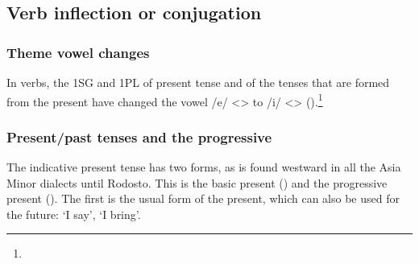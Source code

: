 \subsection{Verb inflection or conjugation}
\subsubsection{Theme vowel changes}
In verbs, the 1SG and 1PL of present tense and of the tenses that are formed from the present have changed the vowel /e/ <> to /i/ <> ().\footnote{}


\begin{table}[H]
	\centering 
	\caption{Change from theme vowel /e/ <> to /i/ <> in the Şebinkarahisar dialect}
	\label{tab:Şebinkarahisar:phonology:eHamshen}
\end{table}

\subsubsection{Present/past tenses and the progressive}

The indicative present tense has two forms, as is found westward in all the Asia Minor dialects until Rodosto. This is the basic present () and the progressive present (). The first is the usual form of the present, which can also be used for the future: `I say', `I bring'.


